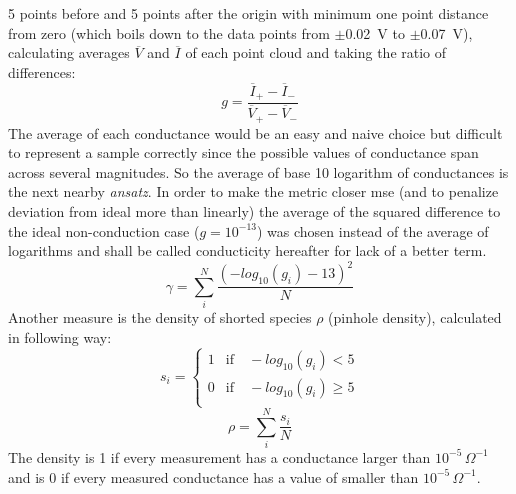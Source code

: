5 points before and 5 points after the origin with minimum one point distance from zero (which boils
down to the data points from $\pm$\SI{0.02}{\volt} to $\pm$\SI{0.07}{\volt}), 
calculating averages $\overline{V}$ and $\overline{I}$ of each point cloud and taking the ratio of differences:
\begin{equation}
    g = \frac{\overline{I}_{+} - \overline{I}_-}{\overline{V}_{+} - \overline{V}_-}
\end{equation}
%
The average of each conductance would be an easy and naive choice but difficult to represent a 
sample correctly since the possible values of conductance span across several magnitudes.
So the average of base 10 logarithm of conductances is the next nearby \textit{ansatz}.
%
In order to make the metric closer 
\gls{mse} (and to penalize deviation from ideal more than linearly) the average of the squared difference 
to the ideal non-conduction case ($g=10^{-13}$) was chosen instead of the average of logarithms and shall be called conducticity hereafter for lack of a better term. 
%
\begin{equation}
    \gamma = \sum_i^N \frac{ (-log_{10}(g_i) - 13)^2}{N}
	\label{eq:gamma}
\end{equation}
Another measure is the density of shorted species $\rho$ (pinhole density), calculated in following way:
\begin{equation}
	s_i = \begin{cases}
        1 &\text{if} \quad -log_{10}(g_i) < 5 \\
        0 &\text{if} \quad -log_{10}(g_i) \geq 5 \\
	\end{cases}
\end{equation}
\begin{equation}
	\rho = \sum_i^N \frac{s_i}{N}
	\label{eq:rho}
\end{equation}
The density is 1 if every measurement has a conductance larger than $10^{-5} \, \Omega^{-1}$ and is 0 if every measured conductance has a value of smaller than $10^{-5} \, \Omega^{-1}$.
%


